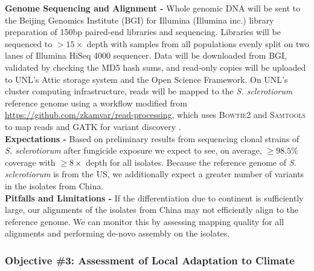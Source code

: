 \documentclass[12pt,letterpaper]{article}
\begin{document}
\noindent \textbf{Genome Sequencing and Alignment -}
Whole genomic DNA will be sent to the Beijing Genomics Institute (BGI) for Illumina (Illumina inc.) library preparation of 150bp paired-end libraries and sequencing. Libraries will be sequenced to $>15\times$ depth with samples from all populations evenly split on two lanes of Illumina HiSeq 4000 sequencer.
Data will be downloaded from BGI, validated by checking the MD5 hash sums, and read-only copies will be uploaded to UNL's Attic storage system and the Open Science Framework. 
On UNL's cluster computing infrastructure, reads will be mapped to the \textit{S. sclerotiorum} reference genome using a workflow modified from \url{https://github.com/zkamvar/read-processing}, which uses \textsc{Bowtie2} and \textsc{Samtools} to map reads and \textsc{GATK} for variant discovery \citep{langmead2012fast, li2009sequence, mckenna2010genome, derbyshire2017complete}.\\ 
\noindent \textbf{Expectations -}
Based on preliminary results from sequencing clonal strains of \textit{S. sclerotiorum} after fungicide exposure we expect to see, on average, $\geq98.5\%$ coverage with $\geq8\times$ depth for all isolates. Because the reference genome of \textit{S. sclerotiorum} is from the US, we additionally expect a greater number of variants in the isolates from China.\\
\noindent \textbf{Pitfalls and Limitations -}
If the differentiation due to continent is sufficiently large, our alignments of the isolates from China may not efficiently align to the reference genome. 
We can monitor this by assessing mapping quality for all alignments and performing de-novo assembly on the isolates.

\subsubsection*{Objective \#3: Assessment of Local Adaptation to Climate}
\end{document}

